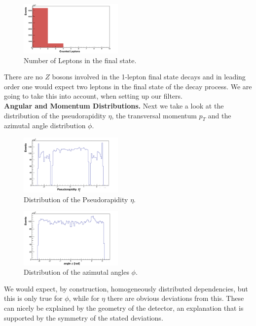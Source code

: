 \documentclass[twocolumn,
			   showpacs,%
               nofootinbib,
               aps,%
               prd,
               notitlepage,
               showkeys,
               10pt]{revtex4-1}
\begin{document}
\begin{figure}[H]
	\centering
	\includegraphics[width=0.45\textwidth]{figures/plots/lep_n_corr}
	\caption{Number of Leptons in the final state.}
	\label{fig:lep_n}
\end{figure}

There are no $Z$ bosons involved in the 1-lepton final state decays and in leading order one would expect two leptons in the final state of the decay process. We are going to take this into account, when setting up our filters.\\

\textbf{Angular and Momentum Distributions.}  
Next we take a look at the distribution of  the pseudorapidity $\eta$, the transversal momentum $p_T$ and the azimutal angle distribution $\phi$.

\begin{figure}[H]
	\centering
	\includegraphics[width=0.45\textwidth]{figures/plots/Pseudorapidity_corr}
	\caption{Distribution of the Pseudorapidity $\eta$.}
\end{figure}

\begin{figure}[H]
	\centering
	\includegraphics[width=0.45\textwidth]{figures/plots/AzimutalAngle_corr}
	\caption{Distribution of the azimutal angles $\phi$.}
\end{figure}

We would expect, by construction, homogeneously distributed dependencies, but this is only true for $\phi$, while for $\eta$ there are obvious deviations from this.
These can nicely be explained by the geometry of the detector, an explanation that is supported by the symmetry of the stated deviations.\\
\end{document}
